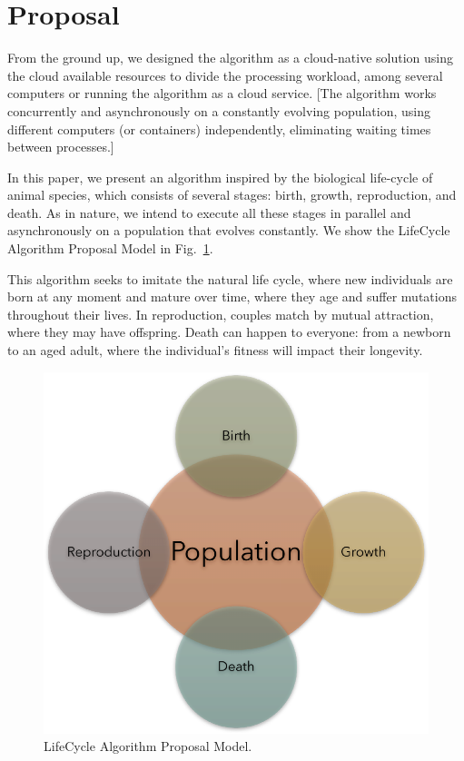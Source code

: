 \documentclass[runningheads]{llncs}
\begin{document}
\section{Proposal} 

From the ground up, we designed the algorithm as a cloud-native solution using
the cloud available resources to divide the processing workload, among several
computers or running the algorithm as a cloud service. [The algorithm works
concurrently and asynchronously on a constantly evolving population, using
different computers (or containers) independently, eliminating waiting times
between processes.]

In this paper, we present an algorithm inspired by the biological life-cycle of
animal species, which consists of several stages: birth, growth, reproduction,
and death. As in nature, we intend to execute all these stages in parallel and
asynchronously on a population that evolves constantly. We show the LifeCycle 
Algorithm Proposal Model in Fig.~\ref{fig2}.

This algorithm seeks to imitate the natural life cycle, where new individuals
are born at any moment and mature over time, where they age and suffer
mutations throughout their lives. In reproduction, couples match by mutual
attraction, where they may have offspring. Death can happen to everyone: from a
newborn to an aged adult, where the individual's fitness will impact their
longevity.

\begin{figure}
    \includegraphics[width=\textwidth]{img/fig2_proposal.pdf}
    \caption{LifeCycle Algorithm Proposal Model.} \label{fig2}
    \end{figure}
\end{document}
